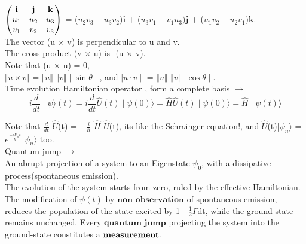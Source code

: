 \documentclass[a4paper, 10pt, onepage]{elegantbook}
\begin{document}
{$\begin{pmatrix} \mathbf{i} & \mathbf{j} & \mathbf{k} \cr u_1 & u_2 & u_3 \cr v_1 & v_2 & v_3 \end{pmatrix}$ =  
($u_2v_3 - u_3v_2)\mathbf{i}$ + ($u_3v_1 - v_1u_3)\mathbf{j}$ + ($u_1v_2 - u_2v_1)\mathbf{k}$.  \\
    
The vector (u $\times$ v) is perpendicular to u and v.  \\

The cross product (v $\times$ u) is -(u $\times$ v).  \\ 

Note that (u $\times$ u) = 0,  \\
 
$\Vert u  \times v \Vert$ = $\Vert u \Vert$ $\Vert v \Vert \mid \sin \theta \mid$, and $\mid u \cdot v \mid$ = $\Vert u \Vert$ $\Vert v \Vert$ $\mid \cos \theta 
\mid$.  \\

Time evolution Hamiltonian operator \label{eq:
Time evolution Hamiltonian operator}, form a complete basis $\rightarrow$  \\

\begin{equation}
i \frac{d}{dt} \mid \psi \rangle(t) = i \frac{d}{dt} \hat U (t) \mid \psi (0) \rangle = \hat H \hat U(t) \mid \psi(0) \rangle = \hat H \mid \psi (t) \rangle
\end{equation}
\noindent

Note that $\frac{d}{dt}$ $\hat U$(t) = $ - \frac{i}{\hbar}$ $\hat H$ $\hat U$(t), its like the Schr$\ddot{o}$inger equation!, and
$\hat U$(t)|$\psi_n \rangle$ = $e^ \frac{ - iE_nt}{\hbar}$ $\psi_n \rangle$ too. \\

Quantum-jump $\rightarrow$ \\
    
An abrupt projection of a system to an Eigenstate $\psi_0$, with a dissipative process(spontaneous emission). \\

The evolution of the system starts from zero, ruled by the effective Hamiltonian. The modification of $\psi (t)$ by $\mathbf{\textbf{non-observation}}$ of spontaneous emission, reduces the population of the state excited by 1 - $\frac{1}{2} \Gamma$dt, while the ground-state remains unchanged. Every $\mathbf{\textbf{quantum jump}}$ projecting the system into the ground-state constitutes a $\mathbf{\textbf{measurement\index{measurement}}}$.  \\

}
\end{document}
